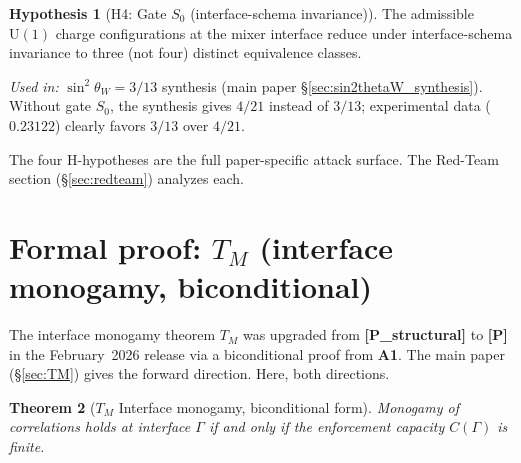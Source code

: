 \documentclass[11pt]{article}
\newcommand{\Un}{\mathrm{U}}
\newcommand{\epitag}[1]{\textbf{[#1]}}
\newcommand{\Aone}{\textbf{A1}}
\newtheorem{theorem}{Theorem}[section]
\theoremstyle{definition}
\newtheorem{hypothesis}[theorem]{Hypothesis}
\begin{document}
\begin{hypothesis}[H4: Gate $S_0$ (interface-schema invariance)]\label{H:S0}
The admissible $\Un(1)$ charge configurations at the mixer interface reduce under interface-schema invariance to three (not four) distinct equivalence classes.
\end{hypothesis}
\emph{Used in:} $\sin^2\theta_W = 3/13$ synthesis (main paper \S\ref{sec:sin2thetaW_synthesis}). Without gate $S_0$, the synthesis gives $4/21$ instead of $3/13$; experimental data ($0.23122$) clearly favors $3/13$ over $4/21$.

The four H-hypotheses are the full paper-specific attack surface. The Red-Team section (\S\ref{sec:redteam}) analyzes each.

\clearpage

\section{Formal proof: \texorpdfstring{$T_M$}{TM} (interface monogamy, biconditional)}\label{sec:TM_full}

The interface monogamy theorem $T_M$ was upgraded from \epitag{P\_structural} to \epitag{P} in the February~2026 release via a biconditional proof from \Aone{}. The main paper (\S\ref{sec:TM}) gives the forward direction. Here, both directions.

\begin{theorem}[$T_M$ Interface monogamy, biconditional form]\label{thm:TM_full}
Monogamy of correlations holds at interface $\Gamma$ if and only if the enforcement capacity $C(\Gamma)$ is finite.
\end{theorem}
\end{document}
